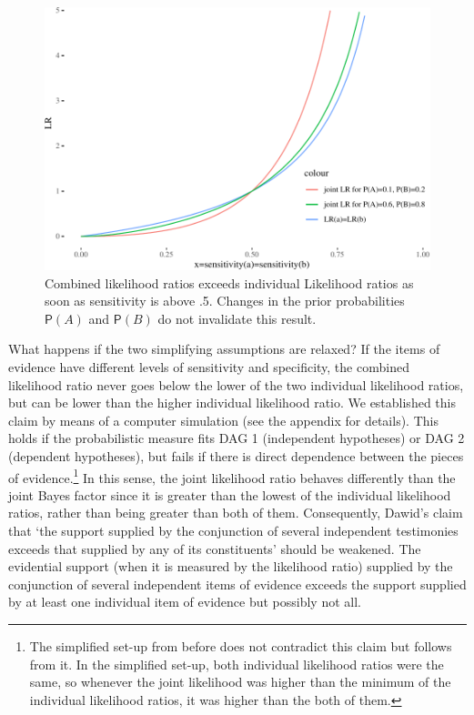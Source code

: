 \documentclass[
  10pt,
  dvipsnames,enabledeprecatedfontcommands]{scrartcl}
\newcommand{\pr}[1]{\ensuremath{\mathsf{P}(#1)}}
\begin{document}
\begin{figure}

\begin{center}\includegraphics[width=0.9\linewidth]{conjunction-paradox4_files/figure-latex/unnamed-chunk-3-1} \end{center}

\caption{Combined likelihood ratios exceeds individual Likelihood ratios as soon as sensitivity is above .5. Changes in the prior probabilities $\pr{A}$ and $\pr{B}$ do not invalidate this result.}
\label{fig:jointLRMarcello}
\end{figure}

What happens if the two simplifying assumptions are relaxed? If the
items of evidence have different levels of sensitivity and specificity,
the combined likelihood ratio never goes below the lower of the two
individual likelihood ratios, but can be lower than the higher
individual likelihood ratio. We established this claim by means of a
computer simulation (see the appendix for details). This holds if the
probabilistic measure fits \textsf{DAG 1} (independent hypotheses) or
\textsf{DAG 2} (dependent hypotheses), but fails if there is direct
dependence between the pieces of evidence.\footnote{The simplified
  set-up from before does not contradict this claim but follows from it.
  In the simplified set-up, both individual likelihood ratios were the
  same, so whenever the joint likelihood was higher than the minimum of
  the individual likelihood ratios, it was higher than the both of them.}
In this sense, the joint likelihood ratio behaves differently than the
joint Bayes factor since it is greater than the lowest of the individual
likelihood ratios, rather than being greater than both of them.
Consequently, Dawid's claim that `the support supplied by the
conjunction of several independent testimonies exceeds that supplied by
any of its constituents' should be weakened. The evidential support
(when it is measured by the likelihood ratio) supplied by the
conjunction of several independent items of evidence exceeds the support
supplied by at least one individual item of evidence but possibly not
all.
\end{document}
